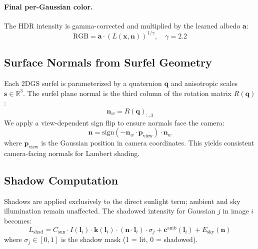\paragraph{Final per-Gaussian color.}
The HDR intensity is gamma-corrected and multiplied by the learned albedo $\mathbf{a}$:
\begin{equation}
    \text{RGB} = \mathbf{a} \cdot \left(L(\mathbf{x}, \mathbf{n})\right)^{1/\gamma}, \quad \gamma = 2.2
    \label{eq:final_color}
\end{equation}

\subsection{Surface Normals from Surfel Geometry}
\label{sec:normals}

Each 2DGS surfel is parameterized by a quaternion $\mathbf{q}$ and anisotropic scales $\mathbf{s} \in \mathbb{R}^3$.
The surfel plane normal is the third column of the rotation matrix $R(\mathbf{q})$:
\begin{equation}
    \mathbf{n}_w = R(\mathbf{q})_{:,3}
\end{equation}
We apply a view-dependent sign flip to ensure normals face the camera:
\begin{equation}
    \mathbf{n} = \text{sign}(-\mathbf{n}_w \cdot \mathbf{p}_{\text{view}}) \cdot \mathbf{n}_w
\end{equation}
where $\mathbf{p}_{\text{view}}$ is the Gaussian position in camera coordinates.
This yields consistent camera-facing normals for Lambert shading.

\subsection{Shadow Computation}
\label{sec:shadows}

Shadows are applied exclusively to the direct sunlight term; ambient and sky illumination remain unaffected.
The shadowed intensity for Gaussian $j$ in image $i$ becomes:
\begin{equation}
    L_{\text{shad}} = C_{\text{sun}} \cdot I(\mathbf{l}_i) \cdot \mathbf{k}(\mathbf{l}_i) \cdot (\mathbf{n}\cdot\mathbf{l}_i) \cdot \sigma_j + \mathbf{c}^{\text{amb}}(\mathbf{l}_i) + E_{\text{sky}}(\mathbf{n})
    \label{eq:shadowed}
\end{equation}
where $\sigma_j \in [0, 1]$ is the shadow mask (1 = lit, 0 = shadowed).

